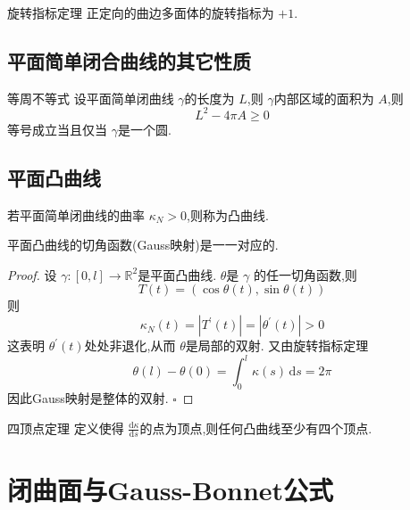 \documentclass[../../main.tex]{subfiles}
\begin{document}
\begin{theorem}{旋转指标定理}
    正定向的曲边多面体的旋转指标为 \(  + 1  \). 
\end{theorem}

\subsection{平面简单闭合曲线的其它性质}

\begin{theorem}{等周不等式}
    设平面简单闭曲线 \(   \gamma   \)的长度为 \(  L  \),则 \(   \gamma   \)内部区域的面积为 \(  A  \),则 \[
    L^{2}-4\pi A\ge 0
    \]等号成立当且仅当 \(   \gamma   \)是一个圆.     
\end{theorem}



\subsection{平面凸曲线}

\begin{definition}
    若平面简单闭曲线的曲率 \(   \kappa _{N}> 0  \),则称为凸曲线. 
\end{definition}

\begin{theorem}
    平面凸曲线的切角函数(Gauss映射)是一一对应的.
\end{theorem}
\begin{proof}
    设 \(   \gamma :[0,l]\to \mathbb{R} ^{2}  \)是平面凸曲线.  \(   \theta   \)是 \(   \gamma   \)  的任一切角函数,则\[
    T\left( t \right)= \left( \cos  \theta \left( t\right),\sin  \theta \left( t \right)   \right)  
    \]则 \[
    \kappa _{N}\left( t \right) = \left| T^{\prime} \left( t \right)  \right|=   \left|  \theta ^{\prime} \left( t \right)  \right|> 0 
    \]这表明 \(   \theta ^{\prime} \left( t \right)   \)处处非退化,从而 \(   \theta   \)是局部的双射.  又由旋转指标定理 \[
     \theta \left( l \right)- \theta \left( 0 \right)= \int_{0}^{l} \kappa \left( s \right)\,\mathrm{d} s= 2\pi    
    \] 因此Gauss映射是整体的双射.
    \hfill $\square$
\end{proof}
\begin{theorem}{四顶点定理}
    定义使得 \(  \frac{\mathrm{d} \kappa }{\mathrm{d}s}  \)的点为顶点,则任何凸曲线至少有四个顶点. 
\end{theorem}
\section{闭曲面与Gauss-Bonnet公式}
\end{document}
